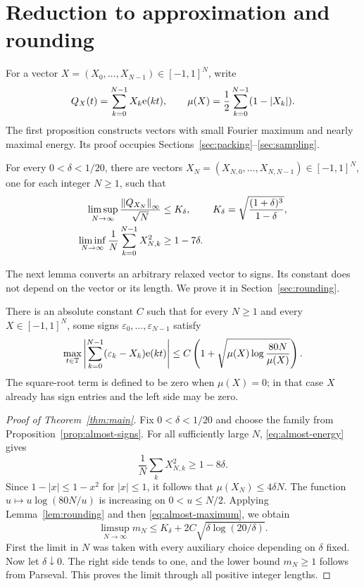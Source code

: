 \section{Reduction to approximation and rounding}\label{sec:reduction}
For a vector $X=(X_0,\ldots,X_{N-1})\in[-1,1]^N$, write
\[
 Q_X(t)=\sum_{k=0}^{N-1}X_k\mathrm e(kt),\qquad
 \mu(X)=\frac12\sum_{k=0}^{N-1}(1-|X_k|).
\]
The first proposition constructs vectors with small Fourier maximum and
nearly maximal energy. Its proof occupies Sections~\ref{sec:packing}--\ref{sec:sampling}.

\begin{proposition}\label{prop:almost-signs}
For every $0<\delta<1/20$, there are vectors
$X_N=(X_{N,0},\ldots,X_{N,N-1})\in[-1,1]^N$, one for each integer
$N\ge1$, such that
\begin{align}
 \limsup_{N\to\infty}\frac{\left\lVert Q_{X_N}\right\rVert_\infty}{\sqrt N}
 &\le K_\delta,
 &K_\delta&=\sqrt{\frac{(1+\delta)^3}{1-\delta}},
 \label{eq:almost-maximum}\\
 \liminf_{N\to\infty}\frac1N\sum_{k=0}^{N-1}X_{N,k}^2
 &\ge1-7\delta.\label{eq:almost-energy}
\end{align}
\end{proposition}

The next lemma converts an arbitrary relaxed vector to signs. Its
constant does not depend on the vector or its length. We prove it in
Section~\ref{sec:rounding}.

\begin{lemma}\label{lem:rounding}
There is an absolute constant $C$ such that for every $N\ge1$ and every
$X\in[-1,1]^N$, some signs $\varepsilon_0,\ldots,\varepsilon_{N-1}$
satisfy
\begin{equation}\label{eq:defect-rounding}
 \max_{t\in\mathbb T}\left|\sum_{k=0}^{N-1}(\varepsilon_k-X_k)\mathrm e(kt)\right|
 \le C\left(1+\sqrt{\mu(X)\log\frac{80N}{\mu(X)}}\right).
\end{equation}
The square-root term is defined to be zero when $\mu(X)=0$; in that case
$X$ already has sign entries and the left side may be zero.
\end{lemma}

\begin{proof}[Proof of Theorem~\ref{thm:main}]
Fix $0<\delta<1/20$ and choose the family from
Proposition~\ref{prop:almost-signs}. For all sufficiently large $N$,
\eqref{eq:almost-energy} gives
\[
 \frac1N\sum_kX_{N,k}^2\ge1-8\delta.
\]
Since $1-|x|\le1-x^2$ for $|x|\le1$, it follows that
$\mu(X_N)\le4\delta N$. The function
$u\mapsto u\log(80N/u)$ is increasing on $0<u\le N/2$.
Applying Lemma~\ref{lem:rounding} and then
\eqref{eq:almost-maximum}, we obtain
\[
 \limsup_{N\to\infty}m_N
 \le K_\delta+2C\sqrt{\delta\log(20/\delta)}.
\]
First the limit in $N$ was taken with every auxiliary choice depending
on $\delta$ fixed. Now let $\delta\downarrow0$. The right side tends to
one, and the lower bound $m_N\ge1$ follows from Parseval. This proves
the limit through all positive integer lengths.
\end{proof}
